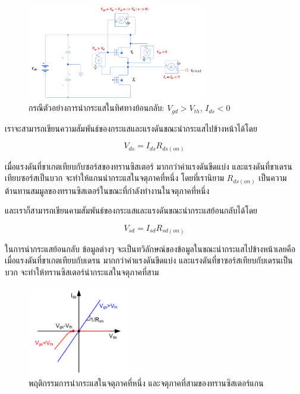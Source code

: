 \documentclass[11pt,a4paper]{article}
\begin{document}
\begin{figure}[h!]
    \centering
    \includegraphics[width=0.7\textwidth]{inverter_q3.png}
    \caption{กรณีตัวอย่างการนำกระแสในทิศทางย้อนกลับ: $V_{gd} > V_{th}$, $I_{ds} < 0$}
    \label{inverter_q1}
\end{figure}

เราจะสามารถเขียนความสัมพันธ์ของกระแสและแรงดันขณะนำกระแสไปข้างหน้าได้โดย

\begin{equation}
    V_{ds} = I_{ds}R_{ds(on)}
\end{equation}

เมื่อแรงดันที่ขาเกตเทียบกับซอร์สของทรานซิสเตอร์ มากกว่าค่าแรงดันขีดแบ่ง และแรงดันที่ขาเดรนเทียบซอร์สเป็นบวก จะทำให้แกนนำกระแสในจตุภาคที่หนึ่ง โดยที่เรานิยาม $R_{ds(on)}$ เป็นความต้านทานสมมูลของทรานซิสเตอร์ในขณะที่กำลังทำงานในจตุภาคที่หนึ่ง

และเราก็สามารถเขียนคามสัมพันธ์ของกระแสและแรงดันขณะนำกระแสย้อนกลับได้โดย

\begin{equation}
    V_{sd} = I_{sd}R_{sd(on)}
\end{equation}

ในการนำกระแสย้อนกลับ ข้อมูลต่างๆ จะเป็นทวิลักษณ์ของข้อมูลในขณะนำกระแสไปข้างหน้าเลยคือ เมื่อแรงดันที่ขาเกตเทียบกับเดรน มากกว่าค่าแรงดันขีดแบ่ง และแรงดันที่ขาซอร์สเทียบกับเดรนเป็นบวก จะทำให้ทรานซิสเตอร์นำกระแสในจตุภาคที่สาม

\begin{figure}[h]
    \centering
    \includegraphics[width=0.4\textwidth]{gan_behavior.png}
    \caption{พฤติกรรมการนำกระแสในจตุภาคที่หนึ่ง และจตุภาคที่สามของทรานซิสเตอร์แกน}
    \label{gan_behavior}
\end{figure}
\end{document}
